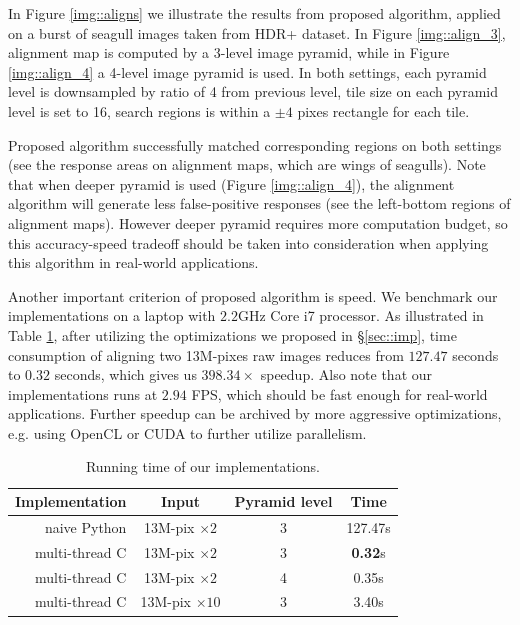\documentclass[conference, 10pt]{IEEEtran}
\makeatletter
\newcommand*{\eg}{e.g.\@\xspace}
\makeatother
\begin{document}
In Figure \ref{img::aligns} we illustrate the results from proposed algorithm, applied
on a burst of seagull images taken from HDR+ dataset. In Figure \ref{img::align_3},
alignment map is computed by a 3-level image pyramid, while in Figure \ref{img::align_4}
a 4-level image pyramid is used. In both settings, each pyramid level is downsampled
by ratio of 4 from previous level, tile size on each pyramid level
is set to 16, search regions is within a $\pm 4$ pixes rectangle for each tile.

Proposed algorithm successfully matched corresponding regions on both settings
(see the response areas on alignment maps, which are wings of seagulls). Note that when
deeper pyramid is used (Figure \ref{img::align_4}), the alignment algorithm will
generate less false-positive responses (see the left-bottom regions of alignment
maps). However deeper pyramid requires more computation budget, so this accuracy-speed
tradeoff should be taken into consideration when applying this algorithm in real-world applications.

Another important criterion of proposed algorithm is speed. We benchmark our implementations
on a laptop with $2.2$GHz Core i7 processor.
As illustrated in Table \ref{tab::speed}, after utilizing the optimizations we proposed in
\S \ref{sec::imp}, time consumption
of aligning two 13M-pixes raw images reduces from $127.47$ seconds to $0.32$ seconds, which
gives us $\mathbf{398.34}\times$ speedup.
Also note that our implementations runs at $2.94$ FPS, which should be fast enough
for real-world applications. Further speedup can be archived by more aggressive
optimizations, \eg using OpenCL or CUDA to further utilize parallelism.

\begin{table}
    \begin{center}
    \small
    \begin{tabular}{r | ccc}
    \hline
    Implementation & Input & Pyramid level & Time \\
    \hline
    naive Python & 13M-pix $\times 2$ & 3 & 127.47s \\
    multi-thread C & 13M-pix $\times 2$ & 3 & \textbf{0.32}s \\
    multi-thread C & 13M-pix $\times 2$ & 4 & 0.35s \\
    multi-thread C & 13M-pix $\times 10$ & 3 & 3.40s \\
    \hline
    \end{tabular}
    \end{center}
\caption{Running time of our implementations.}
\label{tab::speed}
\end{table}



\end{document}
